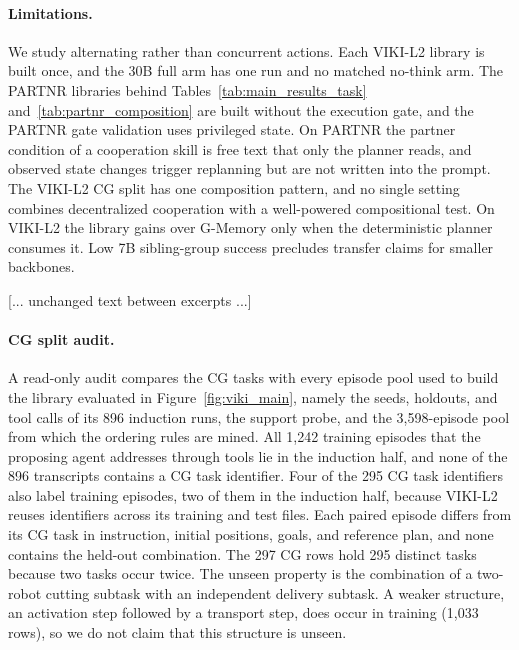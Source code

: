 \paragraph{Limitations.} We study alternating rather than concurrent actions. Each VIKI-L2 library is built once, and the 30B full arm has one run and no matched no-think arm. The PARTNR libraries behind Tables~\ref{tab:main_results_task} and~\ref{tab:partnr_composition} are built without the execution gate, and the PARTNR gate validation uses privileged state. On PARTNR the partner condition of a cooperation skill is free text that only the planner reads, and observed state changes trigger replanning but are not written into the prompt. The VIKI-L2 CG split has one composition pattern, and no single setting combines decentralized cooperation with a well-powered compositional test. On VIKI-L2 the library gains over G-Memory only when the deterministic planner consumes it. Low 7B sibling-group success precludes transfer claims for smaller backbones.

[... unchanged text between excerpts ...]

\paragraph{CG split audit.}
A read-only audit compares the CG tasks with every episode pool used to build the library evaluated in Figure~\ref{fig:viki_main}, namely the seeds, holdouts, and tool calls of its 896 induction runs, the support probe, and the 3{,}598-episode pool from which the ordering rules are mined. All 1{,}242 training episodes that the proposing agent addresses through tools lie in the induction half, and none of the 896 transcripts contains a CG task identifier. Four of the 295 CG task identifiers also label training episodes, two of them in the induction half, because VIKI-L2 reuses identifiers across its training and test files. Each paired episode differs from its CG task in instruction, initial positions, goals, and reference plan, and none contains the held-out combination. The 297 CG rows hold 295 distinct tasks because two tasks occur twice. The unseen property is the combination of a two-robot cutting subtask with an independent delivery subtask. A weaker structure, an activation step followed by a transport step, does occur in training (1{,}033 rows), so we do not claim that this structure is unseen.

